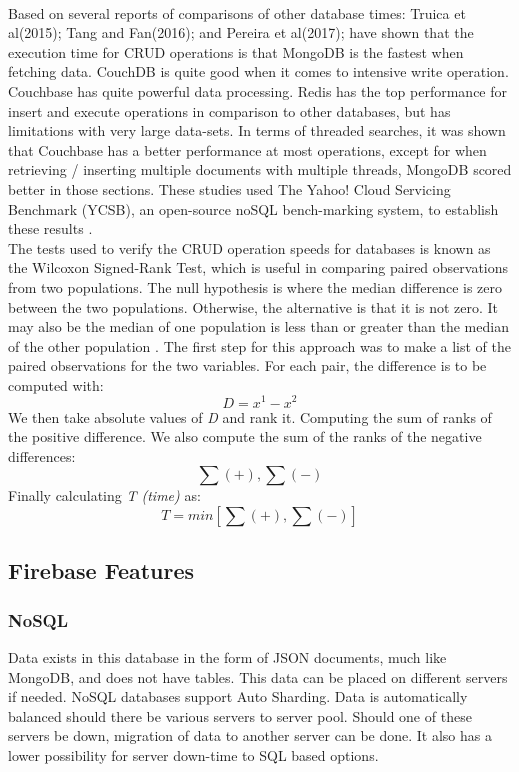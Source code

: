\\ Based on several reports of comparisons of other database times: Truica et al(2015)\cite{truica2015performance}; Tang and Fan(2016)\cite{tang2016performance}; and Pereira et al(2017)\cite{pereira2018nosql}; have shown that the execution time for CRUD operations is that MongoDB is the fastest when fetching data. CouchDB is quite good when it comes to intensive write operation. Couchbase has quite powerful data processing. Redis has the top performance for insert and execute operations in comparison to other databases, but has limitations with very large data-sets. In terms of threaded searches, it was shown that Couchbase has a better performance at most operations, except for when retrieving / inserting multiple documents with multiple threads, MongoDB scored better in those sections. These studies used The Yahoo! Cloud Servicing Benchmark (YCSB), an open-source noSQL bench-marking system, to establish these results \cite{OHYVER2019396}.
\\ The tests used to verify the CRUD operation speeds for databases is known as the Wilcoxon Signed-Rank Test, which is useful in comparing paired observations from two populations. The null hypothesis is where the median difference is zero between the two populations. Otherwise, the alternative is that it is not zero. It may also be the median of one population is less than or greater than the median of the other population \cite{OHYVER2019396}. The first step for this approach was to make a list of the paired observations for the two variables. For each pair, the difference is to be computed with: \[ D = x^1 - x^2 \]
We then take absolute values of \textit{D} and rank it. Computing the sum of ranks of the positive difference. We also compute the sum of the ranks of the negative differences: \[\sum{(+)},\sum{(-)}\]
Finally calculating \textit{T (time)} as: \[T = min[\sum{(+)},\sum{(-)}]\] 
\subsection{Firebase Features}
\subsubsection{NoSQL}
Data exists in this database in the form of JSON documents, much like MongoDB, and does not have tables. This data can be placed on different servers if needed. NoSQL databases support Auto Sharding. Data is automatically balanced should there be various servers to server pool. Should one of these servers be down, migration of data to another server can be done. It also has a lower possibility for server down-time to SQL based options.
